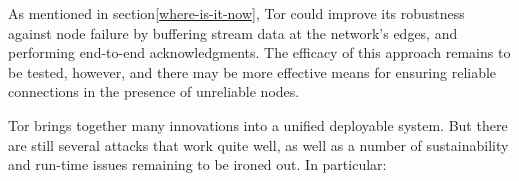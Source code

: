 \documentclass[times,10pt,twocolumn]{article}
\begin{document}
%
As mentioned in section\ref{where-is-it-now}, Tor could improve its
robustness against node failure by buffering stream data at the
network's edges, and performing end-to-end acknowledgments.  The
efficacy of this approach remains to be tested, however, and there
may be more effective means for ensuring reliable connections in the
presence of unreliable nodes.

%






\label{sec:conclusion}


Tor brings together many innovations into
a unified deployable system. But there are still several attacks that
work quite well, as well as a number of sustainability and run-time
issues remaining to be ironed out. In particular:
\end{document}
